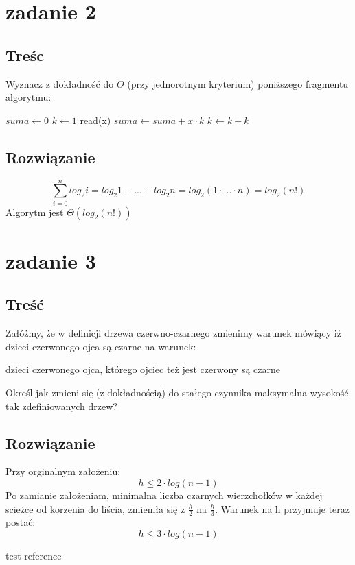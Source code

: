 \documentclass[svgnames]{report}
\begin{document}

\section{zadanie 2}
\subsection{Treśc}
Wyznacz z dokładność do $\Theta$ (przy jednorotnym kryterium) poniższego fragmentu algorytmu:
\begin{algorithmic}
\STATE $suma \leftarrow 0$
	\STATE $k \leftarrow 1$
		\STATE read(x)
		\STATE $suma \leftarrow suma + x \cdot k$
		\STATE $k \leftarrow k + k$
	\ENDWHILE
\ENDFOR
\end{algorithmic}
\subsection{Rozwiązanie}

\begin{equation*}
	\sum\limits_{i=0}^{n} log_2 i = log_2 1 + ... + log_2 n = log_2(1 \cdot ... \cdot n) = log_2(n!)
\end{equation*}
Algorytm jest $\Theta(log_2(n!))$


\section{zadanie 3}
\subsection{Treść}
Załóżmy, że w definicji drzewa czerwno-czarnego zmienimy warunek mówiący iż dzieci czerwonego ojca są czarne na warunek:

dzieci czerwonego ojca, którego ojciec też jest czerwony są czarne

Określ jak zmieni się (z dokładnością) do stałego czynnika maksymalna wysokość tak zdefiniowanych drzew?

\subsection{Rozwiązanie}

Przy orginalnym założeniu:
\begin{equation*}
h \leqslant 2 \cdot log(n-1)
\end{equation*}
Po zamianie założeniam, minimalna liczba czarnych wierzchołków w każdej scieżce od korzenia do liścia, zmieniła się z $\frac{h}{2}$ na $\frac{h}{3}$. Warunek na h przyjmuje teraz postać:
\begin{equation*}
h \leqslant 3 \cdot log(n-1)
\end{equation*}




\begin{thebibliography}{99}
 test reference
\end{thebibliography}
\end{document}
